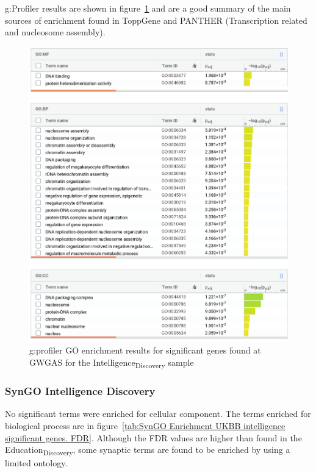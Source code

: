 g:Profiler results are shown in figure~\ref{fig:gprofiler intelligence discovery} and are a good summary of the main sources of enrichment found in ToppGene and PANTHER (Transcription related and nucleosome assembly). 

\begin{figure}
    \centering
    \includegraphics[width=\textwidth]{images/gprofiler/all_terms/ukbbint_all_terms.png}
    \caption{g:profiler GO enrichment results for significant genes found at GWGAS for the Intelligence\textsubscript{Discovery} sample}
    \label{fig:gprofiler intelligence discovery}
\end{figure}

\subsubsection{SynGO Intelligence Discovery}

No significant terms were enriched for cellular component. The terms enriched for biological process are in figure~\ref{tab:SynGO Enrichment UKBB intelligence significant genes. FDR}. Although the FDR values are higher than found in the Education\textsubscript{Discovery}, some synaptic terms are found to be enriched by using a limited ontology. 

